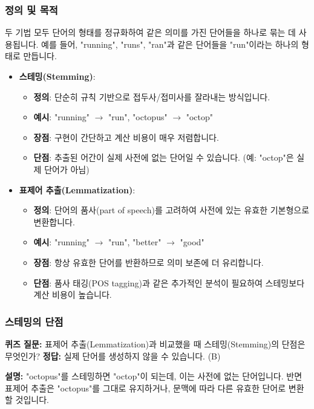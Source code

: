 \documentclass[11pt,a4paper]{article}
\begin{document}
\subsubsection{정의 및 목적}
두 기법 모두 단어의 형태를 정규화하여 같은 의미를 가진 단어들을 하나로 묶는 데 사용됩니다. 예를 들어, "running", "runs", "ran"과 같은 단어들을 "run"이라는 하나의 형태로 만듭니다.

\begin{itemize}
    \item \textbf{스테밍(Stemming)}:
        \begin{itemize}
            \item \textbf{정의}: 단순히 규칙 기반으로 접두사/접미사를 잘라내는 방식입니다.
            \item \textbf{예시}: "running" $\rightarrow$ "run", "octopus" $\rightarrow$ "octop"
            \item \textbf{장점}: 구현이 간단하고 계산 비용이 매우 저렴합니다.
            \item \textbf{단점}: 추출된 어간이 실제 사전에 없는 단어일 수 있습니다. (예: "octop"은 실제 단어가 아님)
        \end{itemize}
    \item \textbf{표제어 추출(Lemmatization)}:
        \begin{itemize}
            \item \textbf{정의}: 단어의 품사(part of speech)를 고려하여 사전에 있는 유효한 기본형으로 변환합니다.
            \item \textbf{예시}: "running" $\rightarrow$ "run", "better" $\rightarrow$ "good"
            \item \textbf{장점}: 항상 유효한 단어를 반환하므로 의미 보존에 더 유리합니다.
            \item \textbf{단점}: 품사 태깅(POS tagging)과 같은 추가적인 분석이 필요하여 스테밍보다 계산 비용이 높습니다.
        \end{itemize}
\end{itemize}

\subsubsection{스테밍의 단점}

\begin{examplebox}
\textbf{퀴즈 질문:} 표제어 추출(Lemmatization)과 비교했을 때 스테밍(Stemming)의 단점은 무엇인가?
\textbf{정답:} 실제 단어를 생성하지 않을 수 있습니다. (B)

\textbf{설명:} "octopus"를 스테밍하면 "octop"이 되는데, 이는 사전에 없는 단어입니다. 반면 표제어 추출은 "octopus"를 그대로 유지하거나, 문맥에 따라 다른 유효한 단어로 변환할 것입니다.
\end{examplebox}
\end{document}
